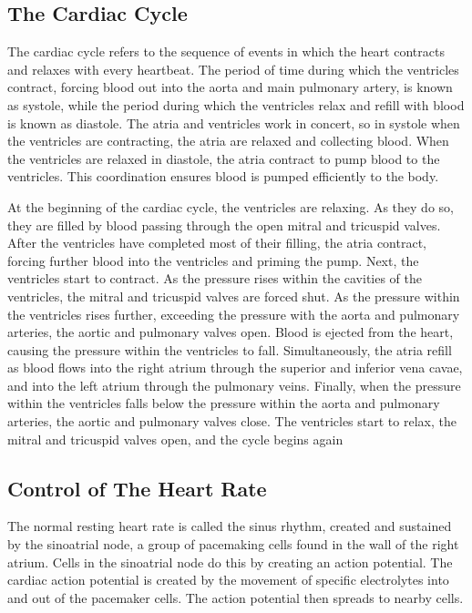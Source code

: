 \hypertarget{the-cardiac-cycle}{%
\subsection{The Cardiac Cycle}\label{the-cardiac-cycle}}

The cardiac cycle refers to the sequence of events in which the heart contracts and relaxes with every heartbeat. The period of time during which the ventricles contract, forcing blood out into the aorta and main pulmonary artery, is known as systole, while the period during which the ventricles relax and refill with blood is known as diastole. The atria and ventricles work in concert, so in systole when the ventricles are contracting, the atria are relaxed and collecting blood. When the ventricles are relaxed in diastole, the atria contract to pump blood to the ventricles. This coordination ensures blood is pumped efficiently to the body.

At the beginning of the cardiac cycle, the ventricles are relaxing. As they do so, they are filled by blood passing through the open mitral and tricuspid valves. After the ventricles have completed most of their filling, the atria contract, forcing further blood into the ventricles and priming the pump. Next, the ventricles start to contract. As the pressure rises within the cavities of the ventricles, the mitral and tricuspid valves are forced shut. As the pressure within the ventricles rises further, exceeding the pressure with the aorta and pulmonary arteries, the aortic and pulmonary valves open. Blood is ejected from the heart, causing the pressure within the ventricles to fall. Simultaneously, the atria refill as blood flows into the right atrium through the superior and inferior vena cavae, and into the left atrium through the pulmonary veins. Finally, when the pressure within the ventricles falls below the pressure within the aorta and pulmonary arteries, the aortic and pulmonary valves close. The ventricles start to relax, the mitral and tricuspid valves open, and the cycle begins again

\hypertarget{control-of-the-heart-rate}{%
\subsection{Control of The Heart Rate}\label{control-of-the-heart-rate}}

The normal resting heart rate is called the sinus rhythm, created and sustained by the sinoatrial node, a group of pacemaking cells found in the wall of the right atrium. Cells in the sinoatrial node do this by creating an action potential. The cardiac action potential is created by the movement of specific electrolytes into and out of the pacemaker cells. The action potential then spreads to nearby cells.




